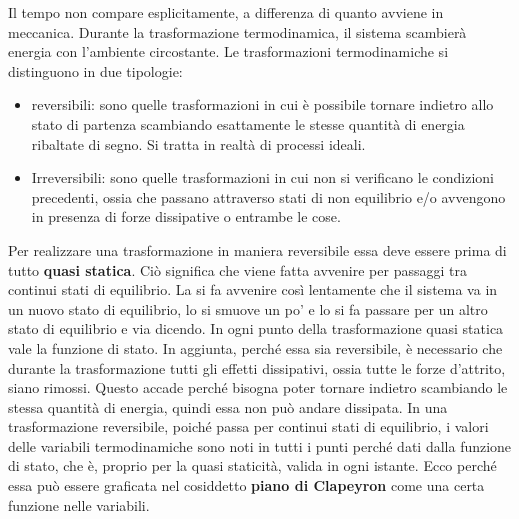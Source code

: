 \begin{figure}[htpb]
\end{figure}
\FloatBarrier
Il tempo non compare esplicitamente, a differenza di quanto avviene in meccanica. Durante la trasformazione termodinamica, il sistema scambierà energia con l'ambiente circostante.
Le trasformazioni termodinamiche si distinguono in due tipologie:

\begin{itemize}
	\item reversibili: sono quelle trasformazioni in cui è possibile tornare indietro allo stato di partenza scambiando esattamente le stesse quantità di energia ribaltate di segno. Si tratta in realtà di processi ideali.
	\item Irreversibili: sono quelle trasformazioni in cui non si verificano le condizioni precedenti, ossia che passano attraverso stati di non equilibrio e/o avvengono in presenza di forze dissipative o entrambe le cose.
\end{itemize}

Per realizzare una trasformazione in maniera reversibile essa deve essere prima di tutto \textbf{quasi statica}. Ciò significa che viene fatta avvenire per passaggi tra continui stati di equilibrio. La si fa avvenire così lentamente che il sistema va in un nuovo stato di equilibrio, lo si smuove un po' e lo si fa passare per un altro stato di equilibrio e via dicendo. In ogni punto della trasformazione quasi statica vale la funzione di stato. In aggiunta, perché essa sia reversibile, è necessario che durante la trasformazione tutti gli effetti dissipativi, ossia tutte le forze d'attrito, siano rimossi. Questo accade perché bisogna poter tornare indietro scambiando le stessa quantità di energia, quindi essa non può andare dissipata.
In una trasformazione reversibile, poiché passa per continui stati di equilibrio, i valori delle variabili termodinamiche sono noti in tutti i punti perché dati dalla funzione di stato, che è, proprio per la quasi staticità, valida in ogni istante. Ecco perché essa può essere graficata nel cosiddetto \textbf{piano di Clapeyron} come una certa funzione nelle variabili.

